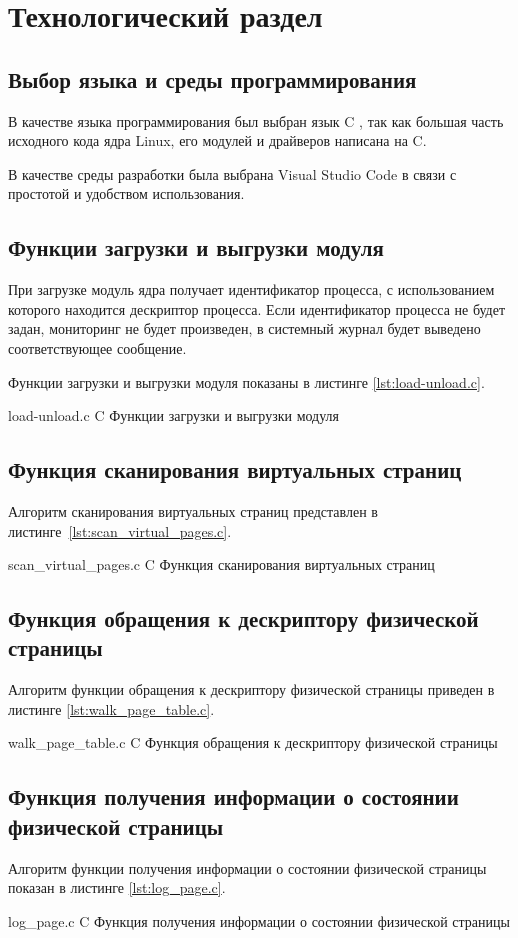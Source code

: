 \chapter{Технологический раздел}

\section{Выбор языка и среды программирования}

В качестве языка программирования был выбран язык C \cite{c}, так как большая часть исходного кода ядра Linux, его модулей и драйверов написана на C.

В качестве среды разработки была выбрана Visual Studio Code \cite{vscode} в связи с простотой и удобством использования.

\section{Функции загрузки и выгрузки модуля}

При загрузке модуль ядра получает идентификатор процесса, с использованием которого находится дескриптор процесса. Если идентификатор процесса не будет задан, мониторинг не будет произведен, в системный журнал будет выведено соответствующее сообщение.

Функции загрузки и выгрузки модуля показаны в листинге \ref{lst:load-unload.c}.

    {load-unload.c}
    {C}
    {Функции загрузки и выгрузки модуля}
    
\section{Функция сканирования виртуальных страниц}

Алгоритм сканирования виртуальных страниц представлен в листинге~\ref{lst:scan_virtual_pages.c}.

    {scan_virtual_pages.c}
    {C}
    {Функция сканирования виртуальных страниц}
    
\newpage

\section{Функция обращения к дескриптору физической страницы}

Алгоритм функции обращения к дескриптору физической страницы приведен в листинге \ref{lst:walk_page_table.c}.

    {walk_page_table.c}
    {C}
    {Функция обращения к дескриптору физической страницы}
    
\section{Функция получения информации о состоянии физической страницы}

Алгоритм функции получения информации о состоянии физической страницы показан в листинге \ref{lst:log_page.c}.

    {log_page.c}
    {C}
    {Функция получения информации о состоянии физической страницы}